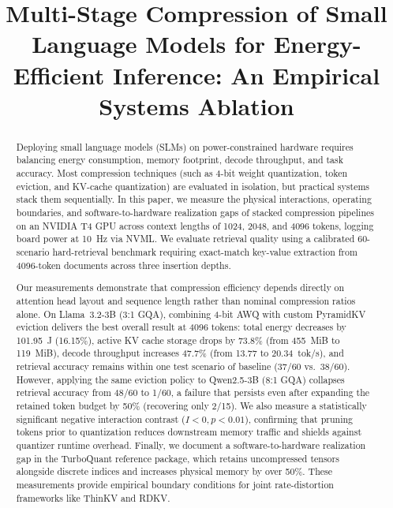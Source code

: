 \documentclass[sigconf,nonacm]{acmart}
\begin{document}
\title{Multi-Stage Compression of Small Language Models for Energy-Efficient Inference: An Empirical Systems Ablation}

\author{\mbox{}}
\renewcommand{\shortauthors}{}

\begin{abstract}
Deploying small language models (SLMs) on power-constrained hardware requires balancing energy consumption, memory footprint, decode throughput, and task accuracy. Most compression techniques (such as 4-bit weight quantization, token eviction, and KV-cache quantization) are evaluated in isolation, but practical systems stack them sequentially. In this paper, we measure the physical interactions, operating boundaries, and software-to-hardware realization gaps of stacked compression pipelines on an NVIDIA T4 GPU across context lengths of 1024, 2048, and 4096 tokens, logging board power at 10~Hz via NVML. We evaluate retrieval quality using a calibrated 60-scenario hard-retrieval benchmark requiring exact-match key-value extraction from 4096-token documents across three insertion depths.

Our measurements demonstrate that compression efficiency depends directly on attention head layout and sequence length rather than nominal compression ratios alone. On Llama~3.2-3B (3:1 GQA), combining 4-bit AWQ with custom PyramidKV eviction delivers the best overall result at 4096 tokens: total energy decreases by 101.95~J (16.15\%), active KV cache storage drops by 73.8\% (from 455~MiB to 119~MiB), decode throughput increases 47.7\% (from 13.77 to 20.34~tok/s), and retrieval accuracy remains within one test scenario of baseline (37/60 vs.\ 38/60). However, applying the same eviction policy to Qwen2.5-3B (8:1 GQA) collapses retrieval accuracy from 48/60 to 1/60, a failure that persists even after expanding the retained token budget by 50\% (recovering only 2/15). We also measure a statistically significant negative interaction contrast ($I < 0, p < 0.01$), confirming that pruning tokens prior to quantization reduces downstream memory traffic and shields against quantizer runtime overhead. Finally, we document a software-to-hardware realization gap in the TurboQuant reference package, which retains uncompressed tensors alongside discrete indices and increases physical memory by over 50\%. These measurements provide empirical boundary conditions for joint rate-distortion frameworks like ThinKV and RDKV.
\end{abstract}
\end{document}
